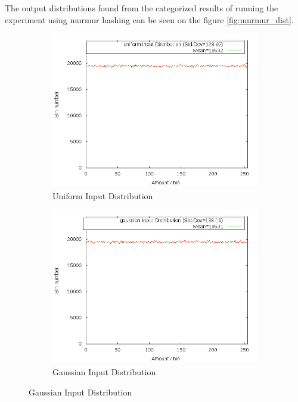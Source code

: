 \documentclass[11pt]{article} %
\begin{document}
The output distributions found from the categorized results of running the experiment using murmur hashing can be seen on the figure \ref{fig:murmur_dist}. 
\begin{figure}[H]
    \centering
    \begin{subfigure}[b]{0.45\textwidth}
        \includegraphics[width=\textwidth]{Graphs/Dist/Murmur_uniform_dist.png}
        \caption{Uniform Input Distribution}
        \label{fig:murmur_dist_uni}
    \end{subfigure}
    \begin{subfigure}[b]{0.45\textwidth}
        \includegraphics[width=\textwidth]{Graphs/Dist/Murmur_gaussian_dist.png}
        \caption{Gaussian Input Distribution}
        \label{fig:murmur_dist_gauss}
    \end{subfigure}
\end{figure}
\end{document}

